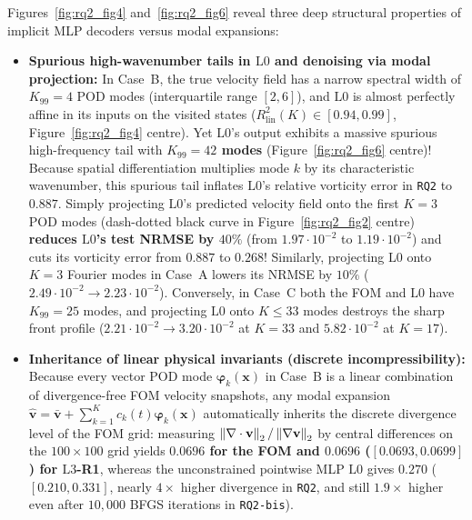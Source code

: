 Figures~\ref{fig:rq2_fig4} and~\ref{fig:rq2_fig6} reveal three deep structural properties of implicit MLP decoders versus modal expansions:
\begin{itemize}[leftmargin=2em]
  \item \textbf{Spurious high-wavenumber tails in $\mathrm{L0}$ and denoising via modal projection:} In Case~B, the true velocity field has a narrow spectral width of $K_{99} = 4$ POD modes (interquartile range $[2,6]$), and $\mathrm{L0}$ is almost perfectly affine in its inputs on the visited states ($R^2_{\mathrm{lin}}(K) \in [0.94, 0.99]$, Figure~\ref{fig:rq2_fig4} centre). Yet $\mathrm{L0}$'s output exhibits a massive spurious high-frequency tail with \textbf{$K_{99} = 42$ modes} (Figure~\ref{fig:rq2_fig6} centre)! Because spatial differentiation multiplies mode $k$ by its characteristic wavenumber, this spurious tail inflates $\mathrm{L0}$'s relative vorticity error in \texttt{RQ2} to $0.887$. Simply projecting $\mathrm{L0}$'s predicted velocity field onto the first $K=3$ POD modes (dash-dotted black curve in Figure~\ref{fig:rq2_fig2} centre) \textbf{reduces $\mathrm{L0}$'s test NRMSE by $40\%$} (from $1.97\cdot 10^{-2}$ to $1.19\cdot 10^{-2}$) and cuts its vorticity error from $0.887$ to $0.268$! Similarly, projecting $\mathrm{L0}$ onto $K=3$ Fourier modes in Case~A lowers its NRMSE by $10\%$ ($2.49\cdot 10^{-2} \to 2.23\cdot 10^{-2}$). Conversely, in Case~C both the FOM and $\mathrm{L0}$ have $K_{99} = 25$ modes, and projecting $\mathrm{L0}$ onto $K \le 33$ modes destroys the sharp front profile ($2.21\cdot 10^{-2} \to 3.20\cdot 10^{-2}$ at $K=33$ and $5.82\cdot 10^{-2}$ at $K=17$).
  \item \textbf{Inheritance of linear physical invariants (discrete incompressibility):} Because every vector POD mode $\boldsymbol{\varphi}_k(\mathbf{x})$ in Case~B is a linear combination of divergence-free FOM velocity snapshots, any modal expansion $\hat{\mathbf{v}} = \bar{\mathbf{v}} + \sum_{k=1}^K c_k(t)\boldsymbol{\varphi}_k(\mathbf{x})$ automatically inherits the discrete divergence level of the FOM grid: measuring $\left\lVert \nabla\cdot\mathbf{v} \right\rVert_2 / \left\lVert \nabla\mathbf{v} \right\rVert_2$ by central differences on the $100\times 100$ grid yields \textbf{$0.0696$ for the FOM and $0.0696$ ($[0.0693, 0.0699]$) for $\mathrm{L3}$-R1}, whereas the unconstrained pointwise MLP $\mathrm{L0}$ gives $0.270$ ($[0.210, 0.331]$, nearly $4\times$ higher divergence in \texttt{RQ2}, and still $1.9\times$ higher even after $10{,}000$ BFGS iterations in \texttt{RQ2-bis}).

\end{itemize}
